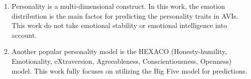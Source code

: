 \begin{enumerate}
    \item Personality is a multi-dimensional construct. In this work, the emotion distribution is the main factor for predicting the personality traits in AVIs. This work do not take emotional stability or emotional intelligence into account. \\
    \item  Another popular personality model is the HEXACO (Honesty-humility, Emotionality, eXtraversion, Agreeableness, Conscientiousness, Openness) model. This work fully focuses on utilizing the Big Five model for predictions.
\end{enumerate}
%

